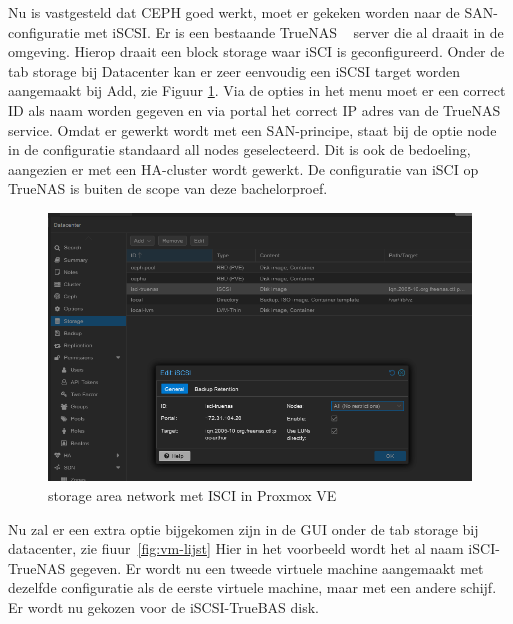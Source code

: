 Nu is vastgesteld dat CEPH goed werkt, moet er gekeken worden naar de SAN-configuratie met iSCSI.
Er is een bestaande TrueNAS ~\autocite{truenas} server die al draait in de omgeving. Hierop draait een block storage waar iSCI is geconfigureerd.
Onder de tab storage bij Datacenter kan er zeer eenvoudig een iSCSI target worden aangemaakt bij Add, zie Figuur \ref{fig:iscsi-SAN}.
Via de opties in het menu moet er een correct ID als naam worden gegeven en via portal het correct IP adres van de TrueNAS service.
Omdat er gewerkt wordt met een SAN-principe, staat bij de optie node in de configuratie standaard all nodes geselecteerd. Dit is ook de bedoeling, aangezien er met een HA-cluster wordt gewerkt.
De configuratie van iSCI op TrueNAS is buiten de scope van deze bachelorproef.
\begin{figure}[H]
  \centering
  \includegraphics[width=1.0\textwidth]{../poc/iscsi-prox.png}
  \caption{storage area network met ISCI in Proxmox VE}
  \label{fig:iscsi-SAN}
\end{figure}
Nu zal er een extra  optie bijgekomen zijn in de GUI onder de tab storage bij datacenter, zie fiuur~\ref{fig:vm-lijst}  Hier in het voorbeeld wordt het al naam iSCI-TrueNAS gegeven.
Er wordt nu een tweede virtuele machine aangemaakt met dezelfde configuratie als de eerste virtuele machine, maar met een andere schijf. Er wordt nu gekozen voor de iSCSI-TrueBAS disk.
